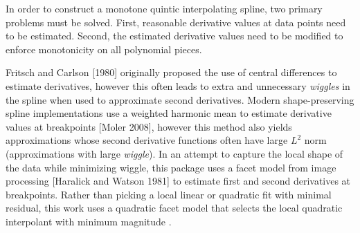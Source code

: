 

In order to construct a monotone quintic interpolating spline, two
primary problems must be solved. First, reasonable derivative values
at data points need to be estimated. Second, the estimated derivative
values need to be modified to enforce monotonicity on all polynomial
pieces.

Fritsch and Carlson [1980] originally proposed the use of central
differences to estimate derivatives, however this often leads to extra
and unnecessary {\it wiggles} in the spline when used to approximate
second derivatives. Modern shape-preserving spline implementations use
a weighted harmonic mean to estimate derivative values at breakpoints
[Moler 2008], however this method also yields approximations whose
second derivative functions often have large  $L^2$ norm
(approximations with large {\it wiggle}). In an attempt to capture the
local shape of the data while minimizing wiggle, this package uses a
facet model from image processing [Haralick and Watson 1981] to
estimate first and second derivatives at breakpoints. Rather than
picking a local linear or quadratic fit with minimal residual, this
work uses a quadratic facet model that selects the local quadratic
interpolant with minimum magnitude .

